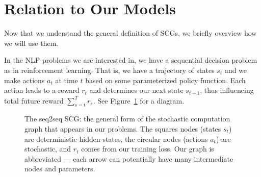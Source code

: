 \documentclass[12pt]{report}
\begin{document}




\section{Relation to Our Models}

Now that we understand the general definition of SCGs, we briefly overview how we will use them.


In the NLP problems we are interested in, we have a sequential decision problem as in reinforcement learning. That is, we have a trajectory of states $s_t$ and we make actions $a_t$ at time $t$ based on some parameterized policy function. Each action leads to a reward $r_t$ and determines our next state $s_{t+1}$, thus influencing total future reward $\sum_{s=t}^T r_s$. See Figure~\ref{fig:our_scg} for a diagram.

\begin{figure}[t]
\begin{center}
\end{center}

\caption[Seq2Seq SCG]{The seq2seq SCG: the general form of the stochastic computation graph that appears in our problems. The squares nodes (states $s_t$) are deterministic hidden states, the circular nodes (actions $a_t$) are stochastic, and $r_t$ comes from our training loss. Our graph is abbreviated --- each arrow can potentially have many intermediate nodes and parameters. }
\label{fig:our_scg}
\end{figure}
\end{document}
